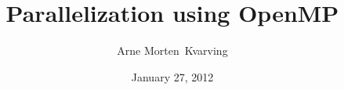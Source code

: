 

%

%
%

{
  \usepackage{fullpage}
  \usepackage{pgf}
  \usepackage{hyperref}
}

{
}
\date[27.01.2012]{January 27, 2012}

\usepackage[latin1]{inputenc}
\usepackage{listings}

\title{Parallelization using OpenMP}
\author{Arne Morten~Kvarving}
\subject{OpenMP programming}


\newcommand{\ub}[1]{\underbar{$#1$}\,}



